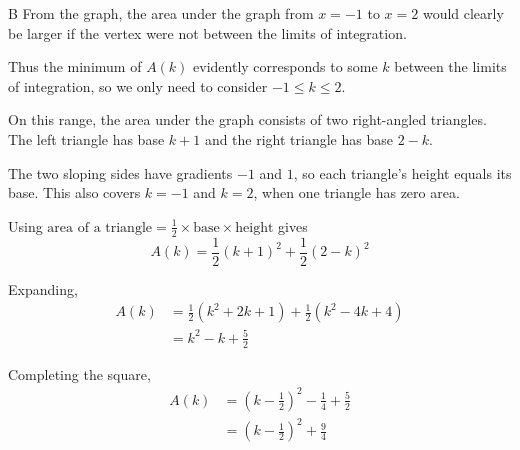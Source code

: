 \documentclass[11pt,a4paper]{article}
\begin{document}
\begin{enumerate}[label=\textbf{\arabic*.},leftmargin=*,itemsep=0pt,start=7]
\begin{djsSolution}{B}
From the graph, the area under the graph from $x=-1$ to $x=2$ would clearly be larger if the vertex were not between the limits of integration.

Thus the minimum of $A(k)$ evidently corresponds to some $k$ between the limits of integration, so we only need to consider $-1\leq k\leq 2$.

On this range, the area under the graph consists of two right-angled triangles. The left triangle has base $k+1$ and the right triangle has base $2-k$.

\begin{djsSolutionFigure}
\end{djsSolutionFigure}

The two sloping sides have gradients $-1$ and $1$, so each triangle's height equals its base. This also covers $k=-1$ and $k=2$, when one triangle has zero area.

Using $\text{area of a triangle}=\frac12\times\text{base}\times\text{height}$ gives
\[
A(k)=\frac12(k+1)^2+\frac12(2-k)^2
\]

Expanding,
\[
\begin{aligned}
A(k)&=\frac12(k^2+2k+1)+\frac12(k^2-4k+4)\\[5pt]
&=k^2-k+\frac52
\end{aligned}
\]

Completing the square,
\[
\begin{aligned}
A(k)&=\left(k-\frac12\right)^2-\frac14+\frac52\\[5pt]
&=\left(k-\frac12\right)^2+\frac94
\end{aligned}
\]


\end{djsSolution}
\end{enumerate}
\end{document}
